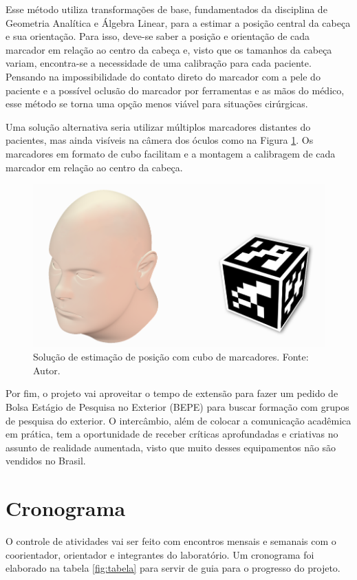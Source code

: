 Esse método utiliza transformações de base, fundamentados da disciplina de Geometria Analítica e Álgebra Linear, para a estimar a posição central da cabeça e sua orientação. Para isso, deve-se saber a posição e orientação de cada marcador em relação ao centro da cabeça e, visto que os tamanhos da cabeça variam, encontra-se a necessidade de uma calibração para cada paciente. Pensando na impossibilidade do contato direto do marcador com a pele do paciente e a possível oclusão do marcador por ferramentas e as mãos do médico, esse método se torna uma opção menos viável para situações cirúrgicas.

Uma solução alternativa seria utilizar múltiplos marcadores distantes do pacientes, mas ainda visíveis na câmera dos óculos como na Figura \ref{fig:cube}. Os marcadores em formato de cubo facilitam e a montagem a calibragem de cada marcador em relação ao centro da cabeça.

\begin{figure}[ht]
    \centering
    \includegraphics[width=.6\linewidth]{figuras/cube.png}
    \caption{Solução de estimação de posição com cubo de marcadores. Fonte: Autor.}
    \label{fig:cube}
\end{figure}

Por fim, o projeto vai aproveitar o tempo de extensão para fazer um pedido de Bolsa Estágio de Pesquisa no Exterior (BEPE) para buscar formação com grupos de pesquisa do exterior. O intercâmbio, além de colocar a comunicação acadêmica em prática, tem a oportunidade de receber críticas aprofundadas e criativas no assunto de realidade aumentada, visto que muito desses equipamentos não são vendidos no Brasil.

\newpage

\section{Cronograma}

O controle de atividades vai ser feito com encontros mensais e semanais com o coorientador, orientador e integrantes do laboratório. Um cronograma foi elaborado na tabela \ref{fig:tabela} para servir de guia para o progresso do projeto.

